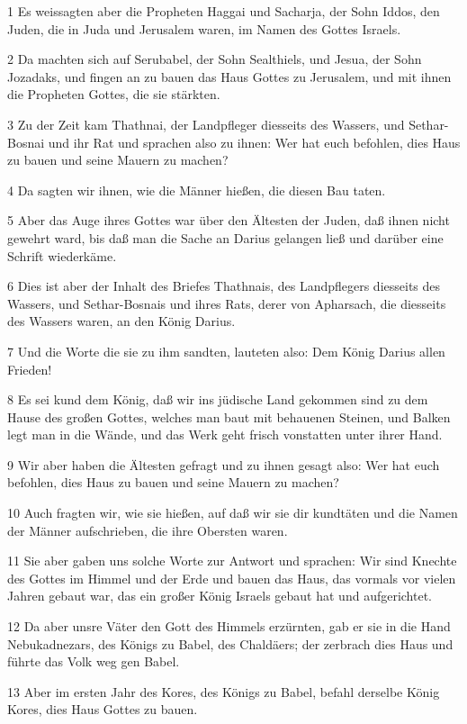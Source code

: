 \par 1 Es weissagten aber die Propheten Haggai und Sacharja, der Sohn Iddos, den Juden, die in Juda und Jerusalem waren, im Namen des Gottes Israels.
\par 2 Da machten sich auf Serubabel, der Sohn Sealthiels, und Jesua, der Sohn Jozadaks, und fingen an zu bauen das Haus Gottes zu Jerusalem, und mit ihnen die Propheten Gottes, die sie stärkten.
\par 3 Zu der Zeit kam Thathnai, der Landpfleger diesseits des Wassers, und Sethar-Bosnai und ihr Rat und sprachen also zu ihnen: Wer hat euch befohlen, dies Haus zu bauen und seine Mauern zu machen?
\par 4 Da sagten wir ihnen, wie die Männer hießen, die diesen Bau taten.
\par 5 Aber das Auge ihres Gottes war über den Ältesten der Juden, daß ihnen nicht gewehrt ward, bis daß man die Sache an Darius gelangen ließ und darüber eine Schrift wiederkäme.
\par 6 Dies ist aber der Inhalt des Briefes Thathnais, des Landpflegers diesseits des Wassers, und Sethar-Bosnais und ihres Rats, derer von Apharsach, die diesseits des Wassers waren, an den König Darius.
\par 7 Und die Worte die sie zu ihm sandten, lauteten also: Dem König Darius allen Frieden!
\par 8 Es sei kund dem König, daß wir ins jüdische Land gekommen sind zu dem Hause des großen Gottes, welches man baut mit behauenen Steinen, und Balken legt man in die Wände, und das Werk geht frisch vonstatten unter ihrer Hand.
\par 9 Wir aber haben die Ältesten gefragt und zu ihnen gesagt also: Wer hat euch befohlen, dies Haus zu bauen und seine Mauern zu machen?
\par 10 Auch fragten wir, wie sie hießen, auf daß wir sie dir kundtäten und die Namen der Männer aufschrieben, die ihre Obersten waren.
\par 11 Sie aber gaben uns solche Worte zur Antwort und sprachen: Wir sind Knechte des Gottes im Himmel und der Erde und bauen das Haus, das vormals vor vielen Jahren gebaut war, das ein großer König Israels gebaut hat und aufgerichtet.
\par 12 Da aber unsre Väter den Gott des Himmels erzürnten, gab er sie in die Hand Nebukadnezars, des Königs zu Babel, des Chaldäers; der zerbrach dies Haus und führte das Volk weg gen Babel.
\par 13 Aber im ersten Jahr des Kores, des Königs zu Babel, befahl derselbe König Kores, dies Haus Gottes zu bauen.
